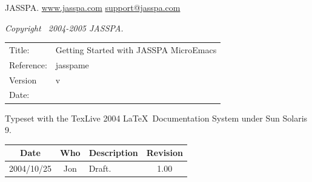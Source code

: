 \documentclass[11pt,a4paper,pdftex]{article}
\newcommand{\docTitle}{Getting Started with JASSPA MicroEmacs}
\newcommand{\docDate}{\CVSDate}
\newcommand{\docVersion}{\CVSRevision}
\newcommand{\docReference}{jasspame}
\newcommand{\tableTitle}[1]{\textbf{#1}}%
\begin{document}
\newpage
\setlength{\parindent}{0pt}
\setlength{\parskip}{0.5ex}
\pagestyle{fancy}

\begin{small}
\vspace{.5in}
JASSPA.
\href{http://www.jasspa.com}{www.jasspa.com}\newline
\href{mailto:support@jasspa.com}{support@jasspa.com}\newline

\vspace{0.5in}

\textit{Copyright \textcopyright\ 2004-2005 JASSPA.}


\vspace{0.5in}

\begin{table}[ht]
  \begin{tabular}{ll}
    Title:        & \docTitle \\
    Reference:    & \docReference \\
    Version       & v\docVersion \\
    Date:         & \docDate \\
  \end{tabular}
\end{table}

Typeset with the TexLive 2004 \LaTeX\ Documentation System under Sun Solaris 9.

\vspace{0.5in}

\begin{center}
  \begin{table}[ht]
    \begin{tabular}{|c|c|p{4in}|c|}
    \hline
    \tableTitle{Date} & \tableTitle{Who} & \tableTitle{Description} & \tableTitle{Revision} \\
    \hline
    2004/10/25 & Jon & Draft. & 1.00 \\ \hline
    \end{tabular}
  \end{table}
\end{center}
\end{small}
\end{document}
